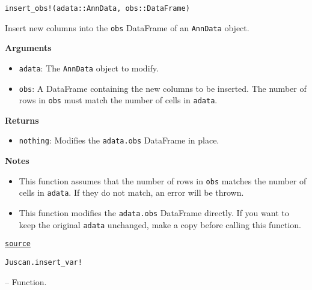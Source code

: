 \documentclass[oneside]{memoir}
\begin{document}
\begin{adjustwidth}{2em}{0pt}


\begin{verbatim}
insert_obs!(adata::AnnData, obs::DataFrame)
\end{verbatim}

Insert new columns into the \texttt{obs} DataFrame of an \texttt{AnnData} object.

\textbf{Arguments}

\begin{itemize}
\item \texttt{adata}: The \texttt{AnnData} object to modify.


\item \texttt{obs}: A DataFrame containing the new columns to be inserted. The number of rows in \texttt{obs} must match the number of cells in \texttt{adata}.

\end{itemize}
\textbf{Returns}

\begin{itemize}
\item \texttt{nothing}: Modifies the \texttt{adata.obs} DataFrame in place.

\end{itemize}
\textbf{Notes}

\begin{itemize}
\item This function assumes that the number of rows in \texttt{obs} matches the number of cells in \texttt{adata}. If they do not match, an error will be thrown.


\item This function modifies the \texttt{adata.obs} DataFrame directly. If you want to keep the original \texttt{adata} unchanged, make a copy before calling this function.

\end{itemize}


\href{https://github.com/zehua0417/Juscan.jl/blob/393ad1b827b678ea98a738f92af658ee9ed9a403/src/anndata.jl#L359-L374}{\texttt{source}}


\end{adjustwidth}
\hypertarget{4357925709652045163}{\texttt{Juscan.insert\_var!}}  -- {Function.}
\end{document}

